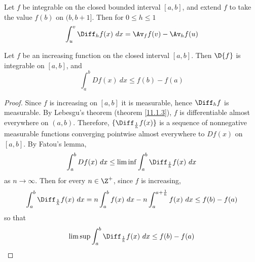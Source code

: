 \begin{lemma}\label{11.1.4}
    Let $f$ be integrable on the closed bounded interval  $[a,b]$, and extend
    $f$ to take the value $f(b)$ on $(b,b+1]$. Then for $0 \leq h \leq 1$
    \begin{equation*}
        \int_u^v{\Diff_h{f(x)} \ dx}=\Av_f{f(v)}-\Av_h{f(u)}
    \end{equation*}
\end{lemma}
\begin{corollary}
    Let $f$ be an increasing function on the closed interval  $[a,b]$. Then
    $\D{f}$ is integrable on $[a,b]$, and
    \begin{equation*}
        \int_a^b{D{f(x)} \ dx} \leq f(b)-f(a)
    \end{equation*}
\end{corollary}
\begin{proof}
    Since $f$ is increasing on  $[a,b]$ it is measurable, hence $\Diff_h{f}$ is
    measurable. By Lebesgu's theorem (theorem \ref{11.1.3}), $f$ is
    differentiable almost everywhere on $(a,b)$. Therefore,
    $\{\Diff_{\frac{1}{h}}{f(x)}\}$ is a sequence of nonnegative measurable
    functions converging pointwise almost everywhere to $D{f(x)}$ on $[a,b]$. By
    Fatou's lemma,
    \begin{equation*}
        \int_a^b{D{f(x)} \ dx} \leq \liminf{\int_a^b{\Diff_{\frac{1}{h}}{f(x)} \
        dx}}
    \end{equation*}
    as $n \xrightarrow{} \infty$. Then for every $n \in \Z^+$, since  $f$ is
    increasing,
    \begin{equation*}
        \int_a^b{\Diff_{\frac{1}{h}}{f(x)} \ dx}=n\int_a^b{f(x) \
        dx}-n\int_a^{a+\frac{1}{h}}{f(x) \ dx} \leq f(b)-f(a)
    \end{equation*}
    so that
    \begin{equation*}
        \limsup{\int_a^b{\Diff_{\frac{1}{h}}{f(x)} \ dx}} \leq f(b)-f(a)
    \end{equation*}
\end{proof}
